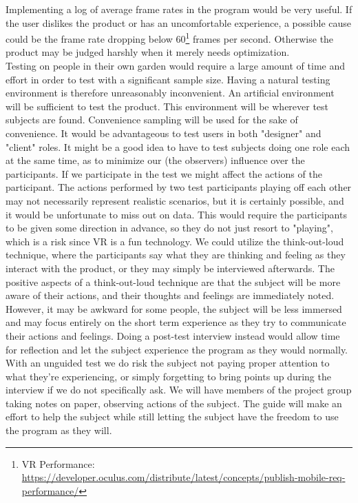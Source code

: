 Implementing a log of average frame rates in the program would be very useful. If the user dislikes the product or has an uncomfortable experience, a possible cause could be the frame rate dropping below 60\footnote{VR Performance: \url{https://developer.oculus.com/distribute/latest/concepts/publish-mobile-req-performance/}} frames per second. Otherwise the product may be judged harshly when it merely needs optimization.\\
Testing on people in their own garden would require a large amount of time and effort in order to test with a significant sample size. Having a natural testing environment is therefore unreasonably inconvenient. An artificial environment will be sufficient to test the product. This environment will be wherever test subjects are found. Convenience sampling will be used for the sake of convenience.
It would be advantageous to test users in both "designer" and "client" roles. It might be a good idea to have to test subjects doing one role each at the same time, as to minimize our (the observers) influence over the participants. If we participate in the test we might affect the actions of the participant. The actions performed by two test participants playing off each other may not necessarily represent realistic scenarios, but it is certainly possible, and it would be unfortunate to miss out on data. This would require the participants to be given some direction in advance, so they do not just resort to "playing", which is a risk since VR is a fun technology. We could utilize the think-out-loud technique, where the participants say what they are thinking and feeling as they interact with the product, or they may simply be interviewed afterwards.   
The positive aspects of a think-out-loud technique are that the subject will be more aware of their actions, and their thoughts and feelings are immediately noted. However, it may be awkward for some people, the subject will be less immersed and may focus entirely on the short term experience as they try to communicate their actions and feelings. Doing a post-test interview instead would allow time for reflection and let the subject experience the program as they would normally. With an unguided test we do risk the subject not paying proper attention to what they're experiencing, or simply forgetting to bring points up during the interview if we do not specifically ask. We will have members of the project group taking notes on paper, observing actions of the subject. The guide will make an effort to help the subject while still letting the subject have the freedom to use the program as they will.

